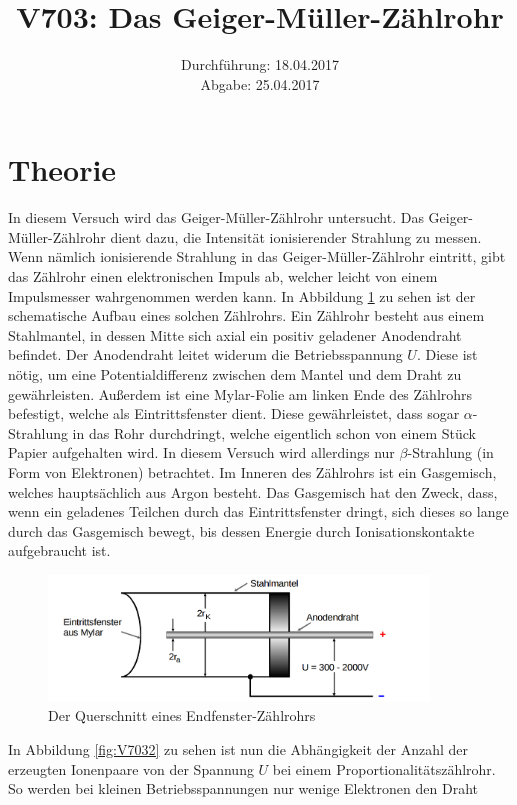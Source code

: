 \documentclass[
  bibliography=totoc,     %
  captions=tableheading,  %
  titlepage=firstiscover, %
]{scrartcl}
\title{V703: Das Geiger-Müller-Zählrohr}
\author{
  Simon Schulte
  \texorpdfstring{
    \\
    \href{mailto:simon.schulte@udo.edu}{simon.schulte@udo.edu}
  }{}
  \texorpdfstring{\and}{, }
  Tim Sedlaczek
  \texorpdfstring{
    \\
    \href{mailto:tim.sedlaczek@udo.edu}{tim.sedlaczek@udo.edu}
  }{}
}
\date{Durchführung: 18.04.2017\\
      Abgabe: 25.04.2017}
\begin{document}
\maketitle
\thispagestyle{empty}
\tableofcontents
\newpage
\section{Theorie}
\label{sec:theorie}
In diesem Versuch wird das Geiger-Müller-Zählrohr untersucht. Das
Geiger-Müller-Zählrohr dient dazu, die Intensität ionisierender Strahlung zu
messen. Wenn nämlich ionisierende Strahlung in das Geiger-Müller-Zählrohr
eintritt, gibt das Zählrohr einen elektronischen Impuls ab, welcher leicht von
einem Impulsmesser wahrgenommen werden kann.
In Abbildung \ref{fig:V7031} zu sehen ist der schematische Aufbau eines
solchen Zählrohrs. Ein Zählrohr besteht aus einem Stahlmantel, in dessen
Mitte sich axial ein positiv geladener Anodendraht befindet. Der Anodendraht
leitet widerum die Betriebsspannung $U$. Diese ist nötig, um eine
Potentialdifferenz zwischen dem Mantel und dem Draht zu gewährleisten. Außerdem
ist eine Mylar-Folie am linken Ende des Zählrohrs befestigt, welche als
Eintrittsfenster dient. Diese gewährleistet, dass sogar $\alpha$-Strahlung in
das Rohr durchdringt, welche eigentlich schon von einem Stück Papier aufgehalten
wird. In diesem Versuch wird allerdings nur $\beta$-Strahlung (in Form von Elektronen) betrachtet. Im
Inneren des Zählrohrs ist ein Gasgemisch, welches hauptsächlich aus Argon besteht. Das Gasgemisch hat den Zweck, dass,
wenn ein geladenes Teilchen durch das Eintrittsfenster dringt, sich dieses so
lange durch das Gasgemisch bewegt, bis dessen Energie durch Ionisationskontakte
aufgebraucht ist.
\begin{figure}[htb]
  \centering
  \includegraphics[width=0.9\textwidth]{V7031.png}
  \caption{Der Querschnitt eines Endfenster-Zählrohrs}
  \label{fig:V7031}
\end{figure}
In Abbildung \ref{fig:V7032} zu sehen ist nun die Abhängigkeit der Anzahl der
erzeugten Ionenpaare von der Spannung $U$ bei einem Proportionalitätszählrohr.
So werden bei kleinen Betriebsspannungen nur wenige Elektronen den Draht
\end{document}
